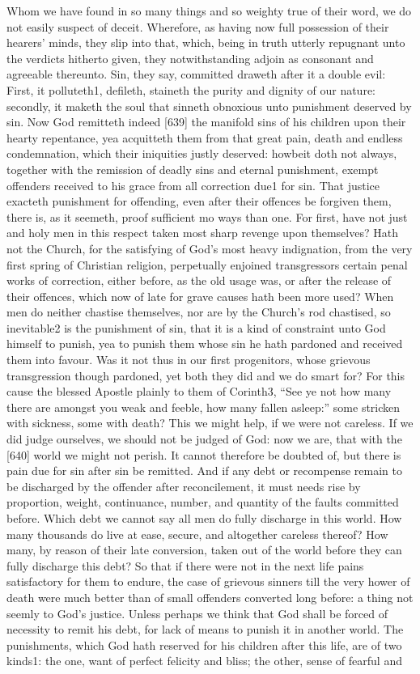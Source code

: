 Whom we have found in so many things and so weighty true of their word, we do not easily suspect of deceit. Wherefore, as having now full possession of their hearers’ minds, they slip into that, which, being in truth utterly repugnant unto the verdicts hitherto given, they notwithstanding adjoin as consonant and agreeable thereunto. Sin, they say, committed draweth after it a double evil: First, it polluteth1, defileth, staineth the purity and dignity of our nature: secondly, it maketh the soul that sinneth obnoxious unto punishment deserved by sin. Now God remitteth indeed [639] the manifold sins of his children upon their hearty repentance, yea acquitteth them from that great pain, death and endless condemnation, which their iniquities justly deserved: howbeit doth not always, together with the remission of deadly sins and eternal punishment, exempt offenders received to his grace from all correction due1 for sin. That justice exacteth punishment for offending, even after their offences be forgiven them, there is, as it seemeth, proof sufficient mo ways than one. For first, have not just and holy men in this respect taken most sharp revenge upon themselves? Hath not the Church, for the satisfying of God’s most heavy indignation, from the very first spring of Christian religion, perpetually enjoined transgressors certain penal works of correction, either before, as the old usage was, or after the release of their offences, which now of late for grave causes hath been more used? When men do neither chastise themselves, nor are by the Church’s rod chastised, so inevitable2 is the punishment of sin, that it is a kind of constraint unto God himself to punish, yea to punish them whose sin he hath pardoned and received them into favour. Was it not thus in our first progenitors, whose grievous transgression though pardoned, yet both they did and we do smart for? For this cause the blessed Apostle plainly to them of Corinth3, “See ye not how many there are amongst you weak and feeble, how many fallen asleep:” some stricken with sickness, some with death? This we might help, if we were not careless. If we did judge ourselves, we should not be judged of God: now we are, that with the [640] world we might not perish. It cannot therefore be doubted of, but there is pain due for sin after sin be remitted. And if any debt or recompense remain to be discharged by the offender after reconcilement, it must needs rise by proportion, weight, continuance, number, and quantity of the faults committed before. Which debt we cannot say all men do fully discharge in this world. How many thousands do live at ease, secure, and altogether careless thereof? How many, by reason of their late conversion, taken out of the world before they can fully discharge this debt? So that if there were not in the next life pains satisfactory for them to endure, the case of grievous sinners till the very hower of death were much better than of small offenders converted long before: a thing not seemly to God’s justice. Unless perhaps we think that God shall be forced of necessity to remit his debt, for lack of means to punish it in another world. The punishments, which God hath reserved for his children after this life, are of two kinds1: the one, want of perfect felicity and bliss; the other, sense of fearful and 